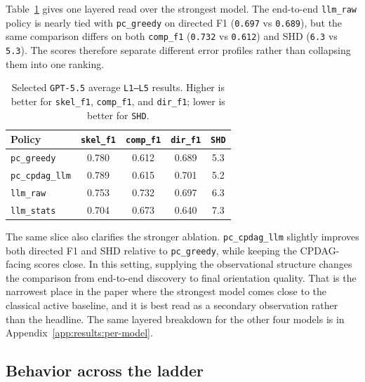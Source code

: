 Table~\ref{tab:results-layered-gpt55} gives one layered read over the strongest model. The end-to-end \texttt{llm\_raw} policy is nearly tied with \texttt{pc\_greedy} on directed F1 (\texttt{0.697} vs \texttt{0.689}), but the same comparison differs on both \texttt{comp\_f1} (\texttt{0.732} vs \texttt{0.612}) and SHD (\texttt{6.3} vs \texttt{5.3}). The scores therefore separate different error profiles rather than collapsing them into one ranking.

\begin{table}[tbp]
\centering
\caption{Selected \texttt{GPT-5.5} average \texttt{L1--L5} results. Higher is better for \texttt{skel\_f1}, \texttt{comp\_f1}, and \texttt{dir\_f1}; lower is better for \texttt{SHD}.}
\label{tab:results-layered-gpt55}
\scriptsize
\setlength{\tabcolsep}{4.0pt}
\begin{tabular}{lcccc}
\toprule
Policy & \texttt{skel\_f1} & \texttt{comp\_f1} & \texttt{dir\_f1} & \texttt{SHD} \\
\midrule
\texttt{pc\_greedy}     & 0.780 & 0.612 & 0.689 & 5.3 \\
\texttt{pc\_cpdag\_llm} & 0.789 & 0.615 & 0.701 & 5.2 \\
\texttt{llm\_raw}       & 0.753 & 0.732 & 0.697 & 6.3 \\
\texttt{llm\_stats}     & 0.704 & 0.673 & 0.640 & 7.3 \\
\bottomrule
\end{tabular}
\end{table}

The same slice also clarifies the stronger ablation. \texttt{pc\_cpdag\_llm} slightly improves both directed F1 and SHD relative to \texttt{pc\_greedy}, while keeping the CPDAG-facing scores close. In this setting, supplying the observational structure changes the comparison from end-to-end discovery to final orientation quality. That is the narrowest place in the paper where the strongest model comes close to the classical active baseline, and it is best read as a secondary observation rather than the headline. The same layered breakdown for the other four models is in Appendix~\ref{app:results:per-model}.

\subsection{Behavior across the ladder}

